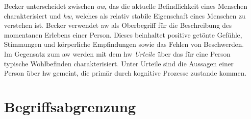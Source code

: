 Becker \cite{Becker:1991} unterscheidet zwischen \textit{\gls{aw}}, das die aktuelle Befindlichkeit eines Menschen charakterisiert und \textit{\gls{hw}}, welches als relativ stabile Eigenschaft eines Menschen zu verstehen ist. Becker verwendet \gls{aw} als Oberbegriff für die Beschreibung des momentanen Erlebens einer Person. Dieses beinhaltet positive getönte Gefühle, Stimmungen und körperliche Empfindungen sowie das Fehlen von Beschwerden. Im Gegensatz zum \gls{aw} werden mit dem \gls{hw} \textit{Urteile} über das für eine Person typische Wohlbefinden charakterisiert. Unter Urteile sind die Aussagen einer Person über \gls{hw} gemeint, die primär durch kognitive Prozesse zustande kommen.

\section{Begriffsabgrenzung}\label{abgrenzung}

